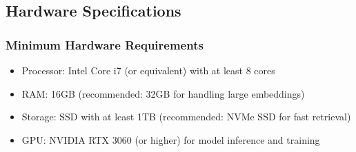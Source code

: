 \documentclass[a4paper,12pt]{article}
\begin{document}
\subsection{Hardware Specifications}
\subsubsection{Minimum Hardware Requirements}
\begin{itemize}
    \item Processor: Intel Core i7 (or equivalent) with at least 8 cores
    \vspace{-10pt}
    \item RAM: 16GB (recommended: 32GB for handling large embeddings)
    \vspace{-10pt}
    \item Storage: SSD with at least 1TB (recommended: NVMe SSD for fast retrieval)
    \vspace{-10pt}
    \item GPU: NVIDIA RTX 3060 (or higher) for model inference and training
\end{itemize}
\newpage
\end{document}
